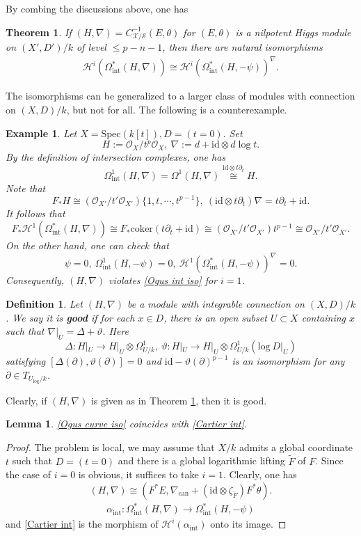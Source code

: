 \documentclass[12pt, a4paper]{article}
\newtheorem{definition}{Definition}[section]
\newtheorem{lemma}{Lemma}[section]
\newtheorem{theorem}{Theorem}[section]
\newtheorem{example}{Example}[section]
\begin{document}
By combing the discussions above, one has
\begin{theorem}\label{SZ Cartier}
If $(H,\nabla)=C^{-1}_{\mathcal X/\mathcal S}(E,\theta)$ for $(E,\theta)$ is a nilpotent Higgs module on $(X',D')/k$ of level $\leq p-n-1$, then there are natural isomorphisms
\begin{eqnarray}\label{Ogus int iso}
\mathcal H^i(\Omega^*_\mathrm{int}(H,\nabla))\cong\mathcal H^i(\Omega_\mathrm{int}^*(H,-\psi))^\nabla.
\end{eqnarray}
\end{theorem}
The isomorphisms can be generalized to a larger class of modules with connection on $(X,D)/k$, but not for all. The following is a counterexample.
\begin{example}
Let $X=\mathrm{Spec}(k[t]), D=(t=0).$ Set
$$
H:=\mathcal O_X/t^p\mathcal O_X,~\nabla:=d+\mathrm{id}\otimes d\log t.
$$
By the definition of intersection complexes, one has 
$$
\Omega^1_\mathrm{int}(H,\nabla)=\Omega^1(H,\nabla)\stackrel{\mathrm{id}\otimes t\partial_t}{\cong}H.$$
Note that 
$$F_*H\cong(\mathcal O_{X'}/t'\mathcal O_{X'})\{1,t,\cdots,t^{p-1}\},~(\mathrm{id}\otimes t\partial_t)\nabla=t\partial_t+\mathrm{id}.$$
It follows that
$$
F_*\mathcal H^1(\Omega^*_\mathrm{int}(H,\nabla))\cong F_*\mathrm{coker}(t\partial_t+\mathrm{id})\cong(\mathcal O_{X'}/t'\mathcal O_{X'})t^{p-1}\cong\mathcal O_{X'}/t'\mathcal O_{X'}.
$$
On the other hand, one can check that
$$
\psi=0,~\Omega^1_\mathrm{int}(H,-\psi)=0,~\mathcal H^1(\Omega^*_\mathrm{int}(H,-\psi))^\nabla=0.
$$
Consequently, $(H,\nabla)$ violates \eqref{Ogus int iso} for $i=1$.
\end{example}
\begin{definition}\label{good}
Let $(H,\nabla)$ be a module with integrable connection on $(X,D)/k$. We say it is {\bfseries good} if for each $x\in D$, there is an open subset $U\subset X$ containing $x$ such that $\nabla|_U=\Delta+\vartheta$. Here
$$
\Delta:H|_{U}\to H|_{U}\otimes\Omega^1_{U/k},~\vartheta:H|_{U}\to H|_{U}\otimes\Omega^1_{U/k}(\mathrm{log}~D|_U)
$$
satisfying $[\Delta(\partial),\vartheta(\partial)]=0$ and $\mathrm{id}-\vartheta(\partial)^{p-1}$ is an isomorphism for any $\partial\in T_{U_{\log}/k}$.
\end{definition}
Clearly, if $(H,\nabla)$ is given as in Theorem \ref{SZ Cartier}, then it is good.
\iffalse
\begin{lemma}
\eqref{Ogus curve iso} coincides with \eqref{Cartier int}.
\end{lemma}
\begin{proof}
The problem is local, we may assume that $X/k$ admits a global coordinate $t$ such that $D=(t=0)$ and there is a global logarithmic lifting $\tilde F$ of $F$. Since the case of $i=0$ is obvious, it suffices to take $i=1$. Clearly, one has 
$$(H,\nabla)\cong(F^*E,\nabla_\mathrm{can}+(\mathrm{id}\otimes\zeta_{\tilde F})F^*\theta).$$
\begin{eqnarray}\label{de Rham F-Higgs int}
\alpha_\mathrm{int}:\Omega_\mathrm{int}^*(H,\nabla)\to\Omega_\mathrm{int}^*(H,-\psi)
\end{eqnarray}
and \eqref{Cartier int} is the morphism of $\mathcal H^i(\alpha_\mathrm{int})$ onto its image.
\end{proof}
\end{document}
